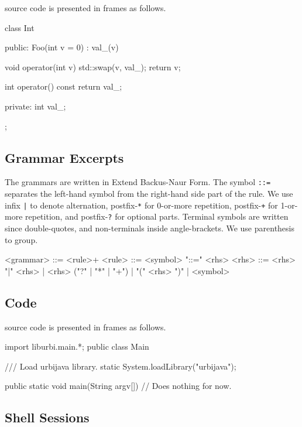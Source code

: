 \Cxx source code is presented in frames as follows.

\begin{cxx}
class Int
{
public:
  Foo(int v = 0)
    : val_(v)
  {}

  void operator(int v)
  {
    std::swap(v, val_);
    return v;
  }

  int operator() const
  {
    return val_;
  }

private:
  int val_;
};
\end{cxx}

\subsection{Grammar Excerpts}
\label{sec:notations:bnf}

The grammars are written in Extend Backus-Naur Form.  The symbol
\lstinline|::=| separates the left-hand symbol from the right-hand side part
of the rule.  We use infix \lstinline{|} to denote alternation,
postfix-\lstinline{*} for 0-or-more repetition, postfix-\lstinline{+} for
1-or-more repetition, and postfix-\lstinline{?} for optional parts.
Terminal symbols are written since double-quotes, and non-terminals inside
angle-brackets.  We use parenthesis to group.

\begin{bnf}
<grammar> ::= <rule>+
<rule> ::= <symbol> "::=" <rhs>
<rhs> ::= <rhs> "|" <rhs>
        | <rhs> ("?" | "*" | "+")
        | "(" <rhs> ")"
        | <symbol>
\end{bnf}

\subsection{\Java Code}
\label{sec:notations:java}

\Java source code is presented in frames as follows.

\begin{java}
import liburbi.main.*;
public class Main
{
    /// Load urbijava library.
    static
    {
        System.loadLibrary("urbijava");
    }

    public static void main(String argv[])
    {
      // Does nothing for now.
    }
}
\end{java}

\subsection{Shell Sessions}
\label{sec:notations:shell}


